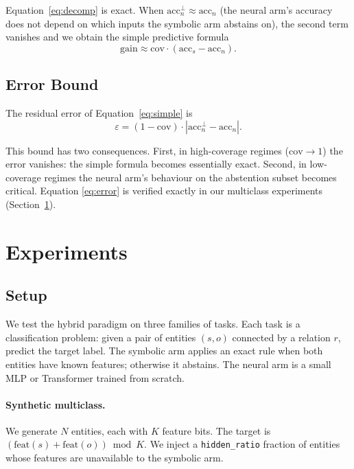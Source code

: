 \documentclass[11pt,a4paper]{article}
\begin{document}
Equation~\ref{eq:decomp} is exact. When $\text{acc}_n^{\bot} \approx
\text{acc}_n$ (the neural arm's accuracy does not depend on which
inputs the symbolic arm abstains on), the second term vanishes and we
obtain the simple predictive formula
\begin{equation}
\text{gain} \approx \text{cov} \cdot (\text{acc}_s - \text{acc}_n).
\label{eq:simple}
\end{equation}

\subsection{Error Bound}

The residual error of Equation~\ref{eq:simple} is
\begin{equation}
\varepsilon = (1 - \text{cov}) \cdot
|\text{acc}_n^{\bot} - \text{acc}_n|.
\label{eq:error}
\end{equation}

This bound has two consequences. First, in high-coverage regimes
($\text{cov} \to 1$) the error vanishes: the simple formula becomes
essentially exact. Second, in low-coverage regimes the neural arm's
behaviour on the abstention subset becomes critical. Equation
\eqref{eq:error} is verified exactly in our multiclass experiments
(Section~\ref{sec:experiments}).

\section{Experiments}
\label{sec:experiments}
\subsection{Setup}

We test the hybrid paradigm on three families of tasks. Each task is
a classification problem: given a pair of entities
$(s, o)$ connected by a relation $r$, predict the target label.
The symbolic arm applies an exact rule when both entities have
known features; otherwise it abstains. The neural arm is a small
MLP or Transformer trained from scratch.

\paragraph{Synthetic multiclass.}
We generate $N$ entities, each with $K$ feature bits. The target is
$(\text{feat}(s) + \text{feat}(o)) \bmod K$. We inject a
\texttt{hidden\_ratio} fraction of entities whose features are
unavailable to the symbolic arm.
\end{document}
